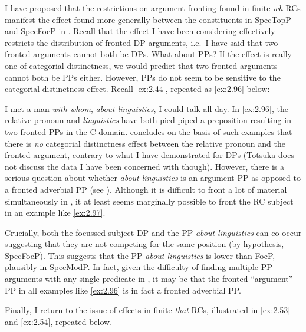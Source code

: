 \documentclass[output=paper]{langsci/langscibook}
\begin{document}
I have proposed that the restrictions on argument fronting found in finite
\emph{wh}{-}RCs manifest the  effect found more
generally between the constituents in SpecTopP and SpecFocP in . Recall
that the  effect I have been considering effectively
restricts the distribution of fronted DP arguments, i.e.\ I have said that two
fronted arguments cannot both be DPs. What about PPs? If the effect is really
one of categorial distinctness, we would predict that two fronted arguments
cannot both be PPs either. However, PPs do not seem to be sensitive to the
categorial distinctness effect. Recall \eqref{ex:2.44}, repeated as \eqref{ex:2.96} below:

\ea\label{ex:2.96}
    I met a man \textit{with whom}, \textit{about linguistics}, I could talk all day.
\z
In \eqref{ex:2.96}, the relative pronoun and \emph{linguistics} have both pied-piped a
preposition resulting in two fronted PPs in the C-domain. \textcite{Totsuka2014}
concludes on the basis of such examples that there is \emph{no} categorial
distinctness effect between the relative pronoun and the fronted argument,
contrary to what I have demonstrated for DPs (Totsuka does not discuss the data
I have been concerned with though). However, there is a serious question about
whether \emph{about linguistics} is an argument PP as opposed to a fronted
adverbial PP (see \citealt[294, 322--325]{Rizzi1997}). Although it is difficult
to front a lot of material simultaneously in , it at least seems
marginally possible to front the \gls{RC} subject in an example like \eqref{ex:2.97}.

\label{ex:2.97}
\z
Crucially, both the focussed subject DP and the PP \emph{about linguistics} can
co-occur suggesting that they are not competing for the same position (by
hypothesis, SpecFocP). This suggests that the PP \emph{about linguistics} is
lower than FocP, plausibly in SpecModP. In fact, given the difficulty of
finding multiple PP arguments with any single predicate in , it may be
that the fronted \enquote{argument} PP in all examples like \eqref{ex:2.96} is in fact a
fronted adverbial PP\@.

Finally, I return to the issue of  effects in finite
\emph{that}{-RCs,} illustrated in \eqref{ex:2.53} and \eqref{ex:2.54},
repeated below.
\end{document}
